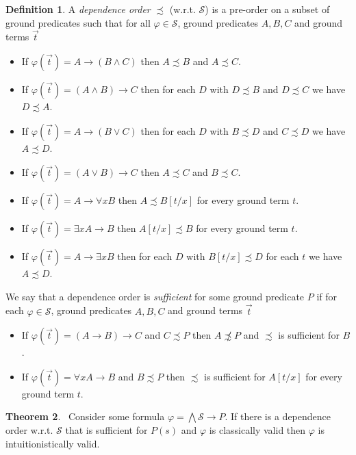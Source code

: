 \documentclass[a4paper,12pt]{report}
\theoremstyle{definition}
\newtheorem{theorem}{Theorem}[section]
\theoremstyle{definition}
\theoremstyle{definition}
\theoremstyle{definition}
\theoremstyle{definition}
\newtheorem{definition}[theorem]{Definition}
\theoremstyle{definition}
\theoremstyle{definition}
\begin{document}
	\begin{definition}
		A \textit{dependence order} $\precsim$ (w.r.t. $\mathcal S$) is a pre-order on a subset of ground predicates such that for all $\varphi\in\mathcal S$, ground predicates $A, B, C$ and ground terms $\vec t$
		\begin{itemize}
			\item If $\varphi(\vec t) = A\to (B\wedge C)$ then $A\precsim B$ and $A\precsim C$.
			\item If $\varphi(\vec t) = (A\wedge B)\to C$ then for each $D$ with $D\precsim B$ and $D\precsim C$ we have $D\precsim A$.
			\item If $\varphi(\vec t) = A\to (B\vee C)$ then for each $D$ with $B\precsim D$ and $C\precsim D$ we have $A\precsim D$.
			\item If $\varphi(\vec t) = (A\vee B)\to C$ then $A\precsim C$ and $B\precsim C$.
			\item If $\varphi(\vec t) = A\to \forall xB$ then $A\precsim B[t/x]$ for every ground term $t$.
			\item If $\varphi(\vec t) = \exists xA\to B$ then $A[t/x]\precsim B$ for every ground term $t$.
			\item If $\varphi(\vec t) = A\to \exists xB$ then for each $D$ with $B[t/x]\precsim D$ for each $t$ we have $A\precsim D$.
		\end{itemize}
		We say that a dependence order is \textit{sufficient} for some ground predicate $P$ if for each $\varphi\in\mathcal S$, ground predicates $A, B, C$ and ground terms $\vec t$
		\begin{itemize}
			\item If $\varphi(\vec t) = (A\to B)\to C$ and $C\precsim P$ then $A\not\precsim P$ and $\precsim$ is sufficient for $B$.
			\item If $\varphi(\vec t) = \forall xA\to B$ and $B\precsim P$ then $\precsim$ is sufficient for $A[t/x]$ for every ground term $t$.
		\end{itemize}
	\end{definition}
	
	\begin{theorem}~\label{dependencetheorem}
		Consider some formula $\varphi = \bigwedge\mathcal S\to P$. If there is a dependence order w.r.t. $\mathcal S$ that is sufficient for $P(s)$ and $\varphi$ is classically valid then $\varphi$ is intuitionistically valid.
	\end{theorem}
	
\end{document}
